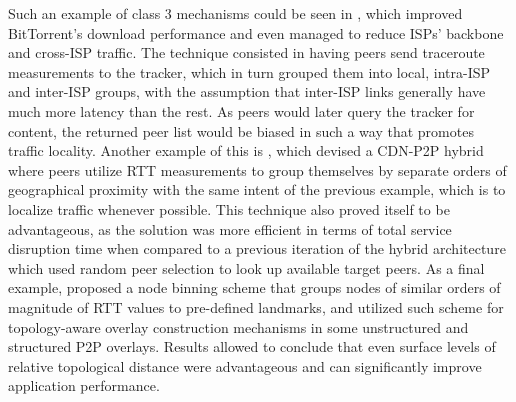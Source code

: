 \begin{itemize}
            Such an example of class 3 mechanisms could be seen in \cite{qin2009}, which improved BitTorrent's download performance and even managed to reduce ISPs' backbone and cross-ISP traffic.
            The technique consisted in having peers send traceroute measurements to the tracker, which in turn grouped them into local, intra-ISP and inter-ISP groups, with the assumption that inter-ISP links generally have much more latency than the rest.
            As peers would later query the tracker for content, the returned peer list would be biased in such a way that promotes traffic locality.
            Another example of this is \cite{kim2011}, which devised a CDN-P2P hybrid where peers utilize RTT measurements to group themselves by separate orders of geographical proximity with the same intent of the previous example, which is to localize traffic whenever possible.
            This technique also proved itself to be advantageous, as the solution was more efficient in terms of total service disruption time when compared to a previous iteration of the hybrid architecture which used random peer selection to look up available target peers.
            As a final example, \cite{topology-aware-p2p-server-selection} proposed a node binning scheme that groups nodes of similar orders of magnitude of RTT values to pre-defined landmarks, and utilized such scheme for topology-aware overlay construction mechanisms in some unstructured and structured P2P overlays.
            Results allowed to conclude that even surface levels of relative topological distance were advantageous and can significantly improve application performance.


\end{itemize}
